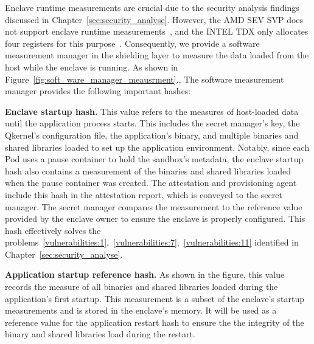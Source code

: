 Enclave runtime measurements are crucial due to the security analysis findings discussed in Chapter~\ref{sec:security_analyse}. However, the AMD SEV SVP does not support enclave runtime measurements~\cite*{snp_firmware}, and the INTEL TDX only allocates four registers for this purpose~\cite*{Intel_tdx_whitepaper}. Consequently, we provide a software measurement 
manager in the shielding layer to measure the data loaded from the host while the enclave is running. As shown in Figure~\ref{fig:soft_ware_manager_meausrment}., The software measurement manager provides the following important hashes:

\textbf{Enclave startup hash.} This value refers to the measures of host-loaded data until the application process starts. This includes the secret manager's key, the Qkernel's configuration file, the application's binary, and multiple binaries and shared libraries loaded to set up the application environment. Notably, since each Pod uses a pause container to hold the 
sandbox's metadata, the enclave startup hash also contains a measurement of the binaries and shared libraries loaded when the pause container was created. The attestation and provisioning agent include this hash in the attestation report, which is conveyed to the secret manager. The secret manager compares the measurement to the reference value provided 
by the enclave owner to ensure the enclave is properly configured. This hash effectively solves the problems~\ref{vulnerabilities:1},~\ref{vulnerabilities:7},~\ref{vulnerabilities:11} identified in Chapter~\ref{sec:security_analyse}.

\textbf{Application startup reference hash.} As shown in the figure, this value records the measure of all binaries and shared libraries loaded during the application's first startup. This measurement is a subset of the enclave's startup measurements and is stored in the enclave's memory. It will be used as a reference value for the application restart hash to ensure the 
the integrity of the binary and shared libraries load during the restart. 

